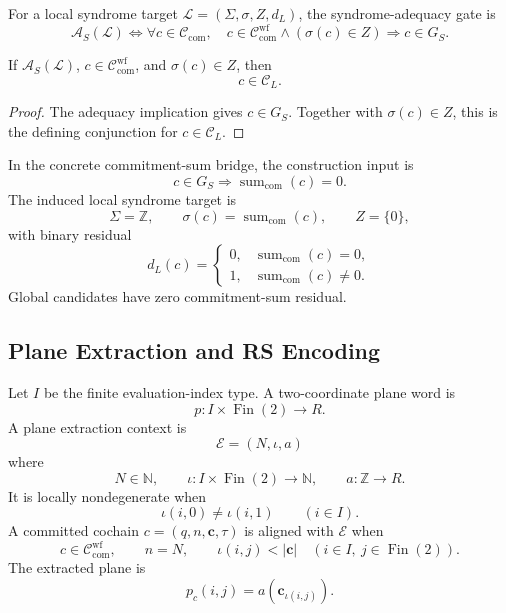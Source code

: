 \begin{definition}\label{def:syndrome-adequacy-gate}
For a local syndrome target \(\mathcal L=(\Sigma,\sigma,Z,d_L)\), the syndrome-adequacy
gate is
\[
  \mathcal A_S(\mathcal L)
  \Longleftrightarrow
  \forall c\in\mathcal C_{\mathrm{com}},\quad
  c\in\mathcal C_{\mathrm{com}}^{\mathrm{wf}}\wedge(\sigma(c)\in Z)
  \Longrightarrow
  c\in G_S.
\]
\end{definition}

\begin{proposition}\label{prop:zero-syndrome-codeword}
If \(\mathcal A_S(\mathcal L)\), \(c\in\mathcal C_{\mathrm{com}}^{\mathrm{wf}}\),
and \(\sigma(c)\in Z\), then
\[
  c\in\mathcal C_L.
\]
\end{proposition}

\begin{proof}
The adequacy implication gives \(c\in G_S\). Together with
\(\sigma(c)\in Z\), this is the defining conjunction for
\(c\in\mathcal C_L\).
\end{proof}

In the concrete commitment-sum bridge, the construction input is
\[
  c\in G_S
  \Longrightarrow
  \operatorname{sum}_{\mathrm{com}}(c)=0.
\]
The induced local syndrome target is
\[
  \Sigma=\mathbb Z,\qquad
  \sigma(c)=\operatorname{sum}_{\mathrm{com}}(c),\qquad
  Z=\{0\},
\]
with binary residual
\[
  d_L(c)=
  \begin{cases}
    0,& \operatorname{sum}_{\mathrm{com}}(c)=0,\\
    1,& \operatorname{sum}_{\mathrm{com}}(c)\ne 0.
  \end{cases}
\]
Global candidates have zero commitment-sum residual.

\subsection{Plane Extraction and RS Encoding}

Let \(I\) be the finite evaluation-index type. A two-coordinate plane word is
\[
  p:I\times\operatorname{Fin}(2)\to R.
\]
A plane extraction context is
\[
  \mathcal E=(N,\iota,a)
\]
where
\[
  N\in\mathbb N,\qquad
  \iota:I\times\operatorname{Fin}(2)\to\mathbb N,\qquad
  a:\mathbb Z\to R.
\]
It is locally nondegenerate when
\[
  \iota(i,0)\ne \iota(i,1)\qquad(i\in I).
\]
A committed cochain \(c=(q,n,\mathbf c,\tau)\) is aligned with
\(\mathcal E\) when
\[
  c\in\mathcal C_{\mathrm{com}}^{\mathrm{wf}},\qquad
  n=N,\qquad
  \iota(i,j)<|\mathbf c|\quad(i\in I,\ j\in\operatorname{Fin}(2)).
\]
The extracted plane is
\[
  p_c(i,j)=a(\mathbf c_{\iota(i,j)}).
\]

